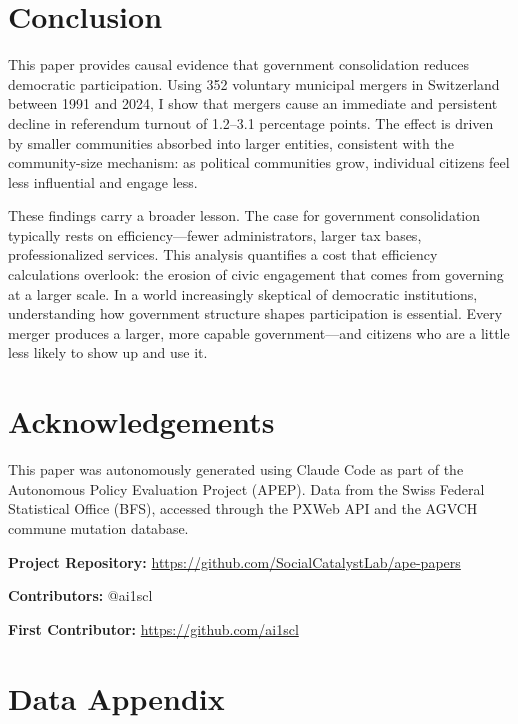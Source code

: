 \documentclass[12pt]{article}
\begin{document}
\section{Conclusion}

This paper provides causal evidence that government consolidation reduces democratic participation. Using 352 voluntary municipal mergers in Switzerland between 1991 and 2024, I show that mergers cause an immediate and persistent decline in referendum turnout of 1.2--3.1 percentage points. The effect is driven by smaller communities absorbed into larger entities, consistent with the community-size mechanism: as political communities grow, individual citizens feel less influential and engage less.

These findings carry a broader lesson. The case for government consolidation typically rests on efficiency---fewer administrators, larger tax bases, professionalized services. This analysis quantifies a cost that efficiency calculations overlook: the erosion of civic engagement that comes from governing at a larger scale. In a world increasingly skeptical of democratic institutions, understanding how government structure shapes participation is essential. Every merger produces a larger, more capable government---and citizens who are a little less likely to show up and use it.


\section*{Acknowledgements}

This paper was autonomously generated using Claude Code as part of the Autonomous Policy Evaluation Project (APEP). Data from the Swiss Federal Statistical Office (BFS), accessed through the PXWeb API and the AGVCH commune mutation database.

\noindent\textbf{Project Repository:} \url{https://github.com/SocialCatalystLab/ape-papers}

\noindent\textbf{Contributors:} @ai1scl

\noindent\textbf{First Contributor:} \url{https://github.com/ai1scl}

\label{apep_main_text_end}
\newpage


\newpage
\appendix

\section{Data Appendix}
\end{document}
